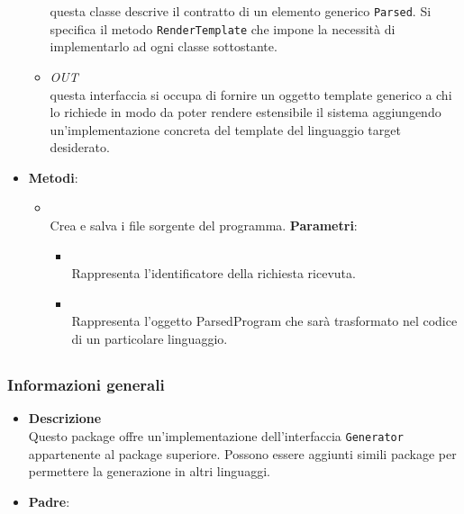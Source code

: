 \begin{itemize}
\begin{itemize}
questa classe descrive il contratto di un elemento generico \texttt{Parsed}. Si specifica il metodo \texttt{RenderTemplate} che impone la necessità di implementarlo ad ogni classe sottostante.
\item \textit{OUT} \hyperref[\nogloxy{swedesigner::server::template::Template}]{}\\
questa interfaccia si occupa di fornire un oggetto template generico a chi lo richiede in modo da poter rendere estensibile il sistema aggiungendo un'implementazione concreta del template del linguaggio target desiderato.
\end{itemize}
\item \textbf{Metodi}:
\begin{itemize}
\item {}
\\ Crea e salva i file sorgente del programma.
\textbf{Parametri}:
\begin{itemize}
\item {}
\\ Rappresenta l'identificatore della richiesta ricevuta.
\item {}
\\ Rappresenta l'oggetto ParsedProgram che sarà trasformato nel codice di un particolare linguaggio. 
\end{itemize}
\end{itemize}
\end{itemize}
\subsection{}
\label{\nogloxy{swedesigner::server::generator::java}}
\subsubsection{Informazioni generali}
\begin{itemize}
\item \textbf{Descrizione}\\
Questo package offre un'implementazione dell'interfaccia \texttt{Generator} appartenente al package superiore. Possono essere aggiunti simili package per permettere la generazione in altri linguaggi.
\item \textbf{Padre}: \hyperref[\nogloxy{swedesigner::server::generator}]{}
\end{itemize}
